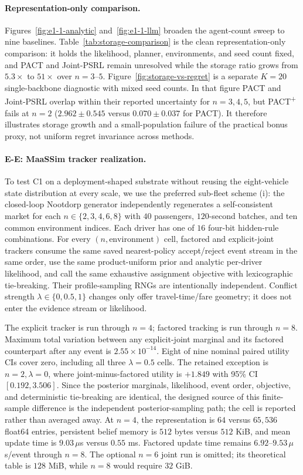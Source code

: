 \paragraph{Representation-only comparison.}
Figures~\ref{fig:e1-1-analytic} and~\ref{fig:e1-1-llm} broaden the agent-count sweep to nine baselines. Table~\ref{tab:storage-comparison} is the clean representation-only comparison: it holds the likelihood, planner, environments, and seed count fixed, and PACT and Joint-PSRL remain unresolved while the storage ratio grows from $5.3\times$ to $51\times$ over $n=3$--$5$. Figure~\ref{fig:storage-vs-regret} is a separate $K=20$ single-backbone diagnostic with mixed seed counts. In that figure PACT and Joint-PSRL overlap within their reported uncertainty for $n=3,4,5$, but PACT\textsuperscript{+} fails at $n=2$ ($2.962\pm0.545$ versus $0.070\pm0.037$ for PACT). It therefore illustrates storage growth and a small-population failure of the practical bonus proxy, not uniform regret invariance across methods.

\paragraph{E-E: MaaSSim tracker realization.}
To test C1 on a deployment-shaped substrate without reusing the eight-vehicle state distribution at every scale, we use the preferred sub-fleet scheme (i): the closed-loop Nootdorp generator independently regenerates a self-consistent market for each $n\in\{2,3,4,6,8\}$ with $40$ passengers, $120$-second batches, and ten common environment indices. Each driver has one of $16$ four-bit hidden-rule combinations. For every $(n,\text{environment})$ cell, factored and explicit-joint trackers consume the same saved nearest-policy accept/reject event stream in the same order, use the same product-uniform prior and analytic per-driver likelihood, and call the same exhaustive assignment objective with lexicographic tie-breaking. Their profile-sampling RNGs are intentionally independent. Conflict strength $\lambda\in\{0,0.5,1\}$ changes only offer travel-time/fare geometry; it does not enter the evidence stream or likelihood.

The explicit tracker is run through $n=4$; factored tracking is run through $n=8$. Maximum total variation between any explicit-joint marginal and its factored counterpart after any event is $2.55\times10^{-14}$. Eight of nine nominal paired utility CIs cover zero, including all three $\lambda=0.5$ cells. The retained exception is $n=2,\lambda=0$, where joint-minus-factored utility is $+1.849$ with 95\% CI $[0.192,3.506]$. Since the posterior marginals, likelihood, event order, objective, and deterministic tie-breaking are identical, the designed source of this finite-sample difference is the independent posterior-sampling path; the cell is reported rather than averaged away. At $n=4$, the representation is $64$ versus $65{,}536$ float64 entries, persistent belief memory is $512$ bytes versus $512$ KiB, and mean update time is $9.03\,\mu$s versus $0.55$ ms. Factored update time remains $6.92$--$9.53\,\mu$s/event through $n=8$. The optional $n=6$ joint run is omitted; its theoretical table is $128$ MiB, while $n=8$ would require $32$ GiB.

